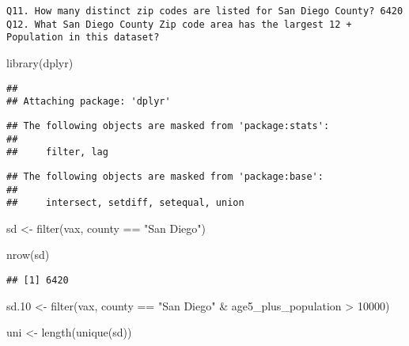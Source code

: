 \documentclass[
]{article}
\newenvironment{Shaded}{\begin{snugshade}}{\end{snugshade}}
\newcommand{\DecValTok}[1]{\textcolor[rgb]{0.00,0.00,0.81}{#1}}
\newcommand{\FloatTok}[1]{\textcolor[rgb]{0.00,0.00,0.81}{#1}}
\newcommand{\FunctionTok}[1]{\textcolor[rgb]{0.00,0.00,0.00}{#1}}
\newcommand{\NormalTok}[1]{#1}
\newcommand{\OtherTok}[1]{\textcolor[rgb]{0.56,0.35,0.01}{#1}}
\newcommand{\SpecialCharTok}[1]{\textcolor[rgb]{0.00,0.00,0.00}{#1}}
\newcommand{\StringTok}[1]{\textcolor[rgb]{0.31,0.60,0.02}{#1}}
\begin{document}
\begin{verbatim}
Q11. How many distinct zip codes are listed for San Diego County? 6420
Q12. What San Diego County Zip code area has the largest 12 + Population in this dataset?
\end{verbatim}

\begin{Shaded}
\begin{Highlighting}[]
\FunctionTok{library}\NormalTok{(dplyr)}
\end{Highlighting}
\end{Shaded}

\begin{verbatim}
## 
## Attaching package: 'dplyr'
\end{verbatim}

\begin{verbatim}
## The following objects are masked from 'package:stats':
## 
##     filter, lag
\end{verbatim}

\begin{verbatim}
## The following objects are masked from 'package:base':
## 
##     intersect, setdiff, setequal, union
\end{verbatim}

\begin{Shaded}
\begin{Highlighting}[]
\NormalTok{sd }\OtherTok{\textless{}{-}} \FunctionTok{filter}\NormalTok{(vax, county }\SpecialCharTok{==} \StringTok{"San Diego"}\NormalTok{)}

\FunctionTok{nrow}\NormalTok{(sd)}
\end{Highlighting}
\end{Shaded}

\begin{verbatim}
## [1] 6420
\end{verbatim}

\begin{Shaded}
\begin{Highlighting}[]
\NormalTok{sd}\FloatTok{.10} \OtherTok{\textless{}{-}} \FunctionTok{filter}\NormalTok{(vax, county }\SpecialCharTok{==} \StringTok{"San Diego"} \SpecialCharTok{\&}
\NormalTok{                age5\_plus\_population }\SpecialCharTok{\textgreater{}} \DecValTok{10000}\NormalTok{)}

\NormalTok{uni }\OtherTok{\textless{}{-}} \FunctionTok{length}\NormalTok{(}\FunctionTok{unique}\NormalTok{(sd))}
\end{Highlighting}
\end{Shaded}
\end{document}
